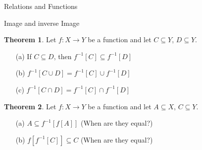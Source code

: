 \documentclass[11pt]{article}
\theoremstyle{definition}
\newtheorem{theorem}{Theorem}[section]
\begin{document}
\begin{section}{Relations and Functions}
\begin{subsection}{Image and inverse Image}
\begin{theorem}
Let $f:X\to Y$ be a function and let $C\subseteq Y$, $D\subseteq Y$.
\begin{enumerate}
\item[(a)] If $C\subseteq D$, then $f^{-1}[C]\subseteq f^{-1}[D]$
\item[(b)] $f^{-1}[C\cup D]=f^{-1}[C]\cup f^{-1}[D]$
\item[(c)] $f^{-1}[C\cap D]=f^{-1}[C]\cap f^{-1}[D]$
\end{enumerate}
\end{theorem}

\begin{theorem}
Let $f:X\to Y$ be a function and let $A\subseteq X$, $C\subseteq Y$.
\begin{enumerate}
\item[(a)] $A\subseteq f^{-1}[f[A]]$ (When are they equal?)
\item[(b)] $f[f^{-1}[C]]\subseteq C$ (When are they equal?)
\end{enumerate}
\end{theorem}

\end{subsection}

\end{section}
\end{document}
